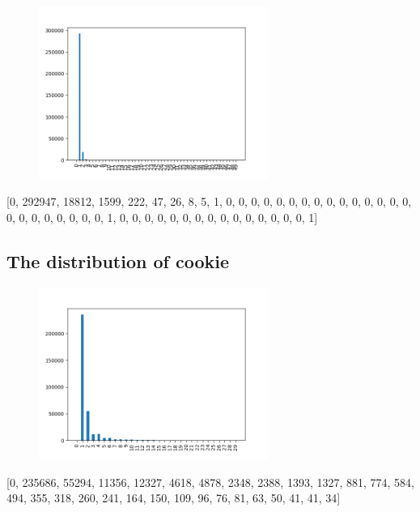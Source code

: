 \documentclass[10pt, conference, compsocconf]{IEEEtran}
\begin{document}
\begin{figure}[H]\centering\includegraphics[width=75mm,scale=0.5]{BasedonClientIDnumdevice}\end{figure}[0, 292947, 18812, 1599, 222, 47, 26, 8, 5, 1, 0, 0, 0, 0, 0, 0, 0, 0, 0, 0, 0, 0, 0, 0, 0, 0, 0, 0, 0, 0, 0, 0, 0, 1, 0, 0, 0, 0, 0, 0, 0, 0, 0, 0, 0, 0, 0, 0, 0, 1]\subsection{The distribution of cookie}
\begin{figure}[H]\centering\includegraphics[width=75mm,scale=0.5]{BasedonClientIDcookiedis}\end{figure}[0, 235686, 55294, 11356, 12327, 4618, 4878, 2348, 2388, 1393, 1327, 881, 774, 584, 494, 355, 318, 260, 241, 164, 150, 109, 96, 76, 81, 63, 50, 41, 41, 34]
\end{document}
